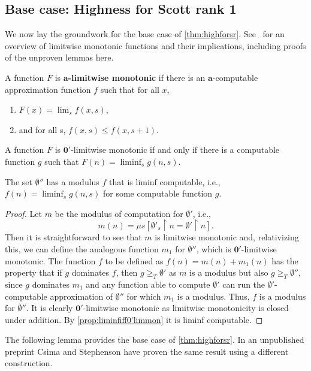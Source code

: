 \documentclass{amsart}
\newcommand\+[1]{\mathcal{#1}}
\renewcommand\*[1]{\mathbf{#1}}
\renewcommand\=[1]{\text{#1}}
\renewcommand\*[1]{\mathbf{#1}}
\DeclareMathOperator{\restrict}{\upharpoonright}
\newcommand{\define}[1]{\textbf{#1}}
\begin{document}
\subsection{Base case: Highness for Scott rank 1}
We now lay the groundwork for the base case of \cref{thm:highforsr}.
See~\cite{downey2011} for an overview of limitwise monotonic functions and their implications, including proofs of the unproven lemmas here. 

\begin{definition}\label{def:alimmon}
  A function $F$ is \define{$\mathbf{a}$-limitwise monotonic} if there is an $\mathbf a$-computable approximation function $f$ such that  for all $x$,
  \begin{enumerate}
    \item $F(x)=\lim_s f(x,s)$,
    \item and for all s, $f(x,s)\leq f(x,s+1)$.
  \end{enumerate}
\end{definition}
\begin{lemma}\label{prop:liminfiff0'limmon}
   A function $F$ is $\mathbf 0'$-limitwise monotonic if and only if there is a computable function $g$ such that $F(n)=\liminf_s g(n,s)$. 
\end{lemma}
\begin{lemma}\label{lem:0''liminfmod}
  The set $\emptyset''$ has a modulus $f$ that is liminf computable, i.e., $f(n)=\liminf_s g(n,s)$ for some computable function $g$.
 \end{lemma}
 \begin{proof} Let $m$ be the modulus of computation for $\emptyset'$, i.e., 
  \[ m(n)=\mu s [\emptyset'_s\restrict n=\emptyset'\restrict n].\]
  Then it is straightforward to see that $m$ is limitwise monotonic and, relativizing this, we can define the analogous function $m_1$ for $\emptyset''$, which is $\mathbf 0'$-limitwise monotonic. The function $f$ to be defined as $f(n)=m(n)+m_1(n)$ has the property that if $g$ dominates $f$, then $g\geq_T \emptyset '$ as $m$ is a modulus but also $g\geq_T \emptyset''$, since $g$ dominates $m_1$ and any function able to compute $\emptyset'$ can run the $\emptyset'$-computable approximation of $\emptyset''$ for which $m_1$ is a modulus. Thus, $f$ is a modulus for $\emptyset''$. It is clearly $\mathbf 0'$-limitwise monotonic as limitwise monotonicity is closed under addition. By \cref{prop:liminfiff0'limmon} it is liminf computable.
 \end{proof}
 The following lemma provides the base case of \cref{thm:highforsr}. In an unpublished preprint Csima and Stephenson have proven the same result using a different construction.  
\end{document}
